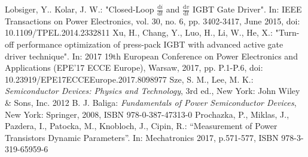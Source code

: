 \documentclass{eeict}
\newcommand{\dxdt}[2]{\frac{\mathrm{d} #1}{\mathrm{d} #2}}
\begin{document}
\begin{thebibliography}{9}
     Lobsiger, Y.. Kolar, J. W.: "Closed-Loop $\dxdt{i}{t}$ and $\dxdt{v}{t}$ IGBT Gate Driver". In: IEEE Transactions on Power Electronics, vol. 30, no. 6, pp. 3402-3417, June 2015, doi: 10.1109/TPEL.2014.2332811
	 Xu, H., Chang, Y., Luo, H., Li, W., He, X.: "Turn-off performance optimization of press-pack IGBT with advanced active gate driver technique". In:  2017 19th European Conference on Power Electronics and Applications (EPE'17 ECCE Europe), Warsaw, 2017, pp. P.1-P.6, doi: 10.23919/EPE17ECCEEurope.2017.8098977
	 Sze, S. M., Lee, M. K.: \textit{Semiconductor Devices: Physics and Technology}, 3rd ed., New York: John Wiley \& Sons, Inc. 2012
	 B. J. Baliga: \textit{Fundamentals of Power Semiconductor Devices}, New York: Springer, 2008, ISBN 978-0-387-47313-0
	Prochazka, P., Miklas, J., Pazdera, I., Patocka, M., Knobloch, J., Cipin, R.: ``Measurement of Power Transistors Dynamic Parameters''. In: {Mechatronics 2017}, p.571-577, ISBN 978-3-319-65959-6
\end{thebibliography}
\end{document}
